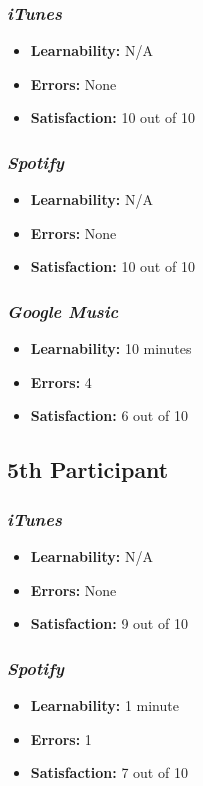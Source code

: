 \documentclass{article}
\begin{document}
{\begin{multicols}{2}
\subsubsection{\it iTunes}
\begin{itemize}
	\item {\bf Learnability:} N/A
	\item {\bf Errors:}  None
	\item {\bf Satisfaction:} 10 out of 10 
\end{itemize}

\subsubsection{\it Spotify}
\begin{itemize}
	\item {\bf Learnability:} N/A
	\item {\bf Errors:} None
	\item {\bf Satisfaction:} 10 out of 10 
\end{itemize}

\subsubsection{\it Google Music}
\begin{itemize}
\item {\bf Learnability:} 10 minutes
	\item {\bf Errors:} 4
	\item {\bf Satisfaction:} 6 out of 10 
\end{itemize}

\subsection{5th Participant}

\subsubsection{\it iTunes}
\begin{itemize}
	\item {\bf Learnability:} N/A
	\item {\bf Errors:}  None
	\item {\bf Satisfaction:} 9 out of 10 
\end{itemize}

\subsubsection{\it Spotify}
\begin{itemize}
	\item {\bf Learnability:} 1 minute
	\item {\bf Errors:} 1
	\item {\bf Satisfaction:} 7 out of 10 
\end{itemize}


\end{multicols}}
\end{document}
